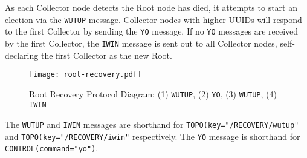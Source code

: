 As each Collector node detects the Root node has died, it attempts to start an election via the \texttt{WUTUP} message.
Collector nodes with higher UUIDs will respond to the first Collector by sending the \texttt{YO} message. If no
\texttt{YO} messages are received by the first Collector, the \texttt{IWIN} message is sent out to all Collector nodes,
self-declaring the first Collector as the new Root.

\begin{figure}[H]
    \centering
    \texttt{[image: root-recovery.pdf]}
    \label{fig:proto_root_reco_image}
    \caption[Root Recovery Protocol Diagram]
	    {Root Recovery Protocol Diagram: (1) \texttt{WUTUP}, (2) \texttt{YO}, (3) \texttt{WUTUP}, (4) \texttt{IWIN}}
\end{figure}

The \texttt{WUTUP} and \texttt{IWIN} messages are shorthand for \texttt{TOPO(key="/RECOVERY/wutup"} and
\texttt{TOPO(key="/RECOVERY/iwin"} respectively. The \texttt{YO} message is shorthand for
\texttt{CONTROL(command="yo")}.
